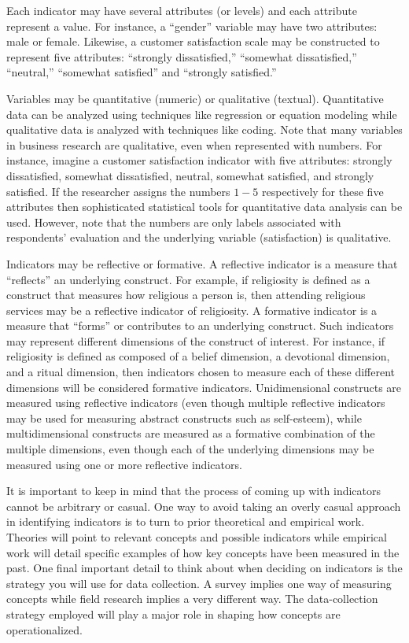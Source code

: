 Each indicator may have several attributes (or levels) and each attribute represent a value. For instance, a ``gender'' variable may have two attributes: male or female. Likewise, a customer satisfaction scale may be constructed to represent five attributes: ``strongly dissatisfied,'' ``somewhat dissatisfied,'' ``neutral,'' ``somewhat satisfied'' and ``strongly satisfied.'' 

Variables may be quantitative (numeric) or qualitative (textual). Quantitative data can be analyzed using techniques like regression or equation modeling while qualitative data is analyzed with techniques like coding. Note that many variables in business research are qualitative, even when represented with numbers. For instance, imagine a customer satisfaction indicator with five attributes: strongly dissatisfied, somewhat dissatisfied, neutral, somewhat satisfied, and strongly satisfied. If the researcher assigns the numbers $ 1-5 $ respectively for these five attributes then sophisticated statistical tools for quantitative data analysis can be used. However, note that the numbers are only labels associated with respondents' evaluation and the underlying variable (satisfaction) is qualitative.

Indicators may be reflective or formative. A reflective indicator is a measure that ``reflects'' an underlying construct. For example, if religiosity is defined as a construct that measures how religious a person is, then attending religious services may be a reflective indicator of religiosity. A formative indicator is a measure that ``forms'' or contributes to an underlying construct. Such indicators may represent different dimensions of the construct of interest. For instance, if religiosity is defined as composed of a belief dimension, a devotional dimension, and a ritual dimension, then indicators chosen to measure each of these different dimensions will be considered formative indicators. Unidimensional constructs are measured using reflective indicators (even though multiple reflective indicators may be used for measuring abstract constructs such as self-esteem), while multidimensional constructs are measured as a formative combination of the multiple dimensions, even though each of the underlying dimensions may be measured using one or more reflective indicators.

It is important to keep in mind that the process of coming up with indicators cannot be arbitrary or casual. One way to avoid taking an overly casual approach in identifying indicators is to turn to prior theoretical and empirical work. Theories will point to relevant concepts and possible indicators while empirical work will detail specific examples of how key concepts have been measured in the past. One final important detail to think about when deciding on indicators is the strategy you will use for data collection. A survey implies one way of measuring concepts while field research implies a very different way. The data-collection strategy employed will play a major role in shaping how concepts are operationalized.

